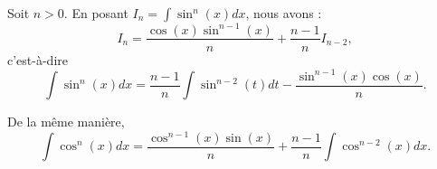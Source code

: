 \begin{lemma}     \label{LEMooMGUVooIIQSmC}
    Soit \( n>0\). En posant \( I_n=\int\sin^n(x)dx\), nous avons :
    \begin{equation}
        I_n=\frac{ \cos(x)\sin^{n-1}(x) }{ n }+\frac{ n-1 }{ n }I_{n-2},
    \end{equation}
    c'est-à-dire
    \begin{equation}
        \int\sin^n(x)dx=\frac{ n-1 }{ n }\int\sin^{n-2}(t)dt-\frac{ \sin^{n-1}(x)\cos(x) }{ n }.
    \end{equation}

    De la même manière,
    \begin{equation}        \label{EQooWJMIooSgBbJx}
        \int\cos^n(x)dx=\frac{ \cos^{n-1}(x)\sin(x) }{ n }+\frac{ n-1 }{ n }\int\cos^{n-2}(x)dx.
    \end{equation}
\end{lemma}

